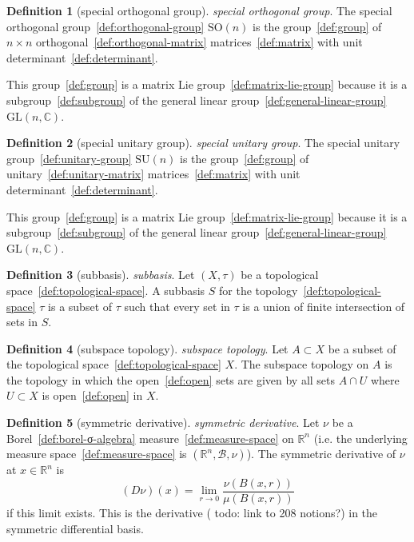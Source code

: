 \documentclass[12pt,a4paper]{article}
\theoremstyle{definition}
\newtheorem{definition}{Definition}
\begin{document}
\begin{definition}[special orthogonal group]\label{def:special-orthogonal-group}
\emph{special orthogonal group}. The special orthogonal group~\ref{def:orthogonal-group} $\text{SO}(n)$ is the group~\ref{def:group} of $n\times n$ orthogonal~\ref{def:orthogonal-matrix} matrices~\ref{def:matrix} with unit determinant~\ref{def:determinant}.

This group~\ref{def:group} is a matrix Lie group~\ref{def:matrix-lie-group} because it is a subgroup~\ref{def:subgroup} of the general linear group~\ref{def:general-linear-group} $\text{GL}(n,\mathbb C)$.
\end{definition}

\begin{definition}[special unitary group]\label{def:special-unitary-group}
\emph{special unitary group}. The special unitary group~\ref{def:unitary-group} $\text{SU}(n)$ is the group~\ref{def:group} of unitary~\ref{def:unitary-matrix} matrices~\ref{def:matrix} with unit determinant~\ref{def:determinant}.

This group~\ref{def:group} is a matrix Lie group~\ref{def:matrix-lie-group} because it is a subgroup~\ref{def:subgroup} of the general linear group~\ref{def:general-linear-group} $\text{GL}(n,\mathbb C)$.
\end{definition}

\begin{definition}[subbasis]\label{def:subbasis}
\emph{subbasis}. Let $(X,\tau)$ be a topological space~\ref{def:topological-space}. A subbasis $S$ for the topology~\ref{def:topological-space} $\tau$ is a subset of $\tau$ such that every  set in $\tau$ is a union of finite intersection of sets in $S$.
\end{definition}

\begin{definition}[subspace topology]\label{def:subspace-topology}
\emph{subspace topology}. Let $A\subset X$ be a subset of the topological space~\ref{def:topological-space} $X$. The subspace topology on $A$ is the topology in which the open~\ref{def:open} sets are given by all sets $A \cap U$ where $U\subset X$ is open~\ref{def:open} in $X$.
\end{definition}

\begin{definition}[symmetric derivative]\label{def:symmetric-derivative}
\emph{symmetric derivative}. Let $\nu$ be a Borel~\ref{def:borel-σ-algebra} measure~\ref{def:measure-space} on $\mathbb R^n$ (i.e. the underlying measure space~\ref{def:measure-space} is $(\mathbb R^n, \mathcal B, \nu)$). The symmetric derivative of $\nu$ at $x \in \mathbb R^n$ is $$(D\nu)(x) = \lim_{r\to 0} \frac{\nu(B(x,r))}{\mu(B(x,r))}$$ if this limit exists. This is the derivative ( todo: link to 208 notions?) in the symmetric differential basis.
\end{definition}
\end{document}
